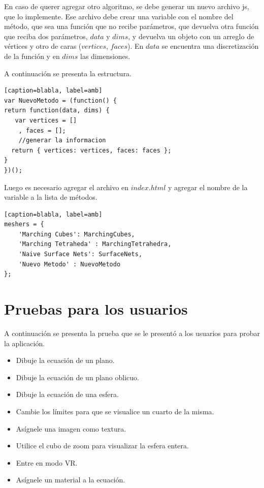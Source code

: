 \documentclass[12pt]{article}
\begin{document}
En caso de querer agregar otro algoritmo, se debe generar un nuevo archivo js, que lo implemente. Ese archivo debe crear una variable con el nombre del método, que sea una función que no recibe parámetros, que devuelva otra función que reciba dos parámetros, $data$ y $dims$, y devuelva un objeto con un arreglo de vértices y otro de caras ($vertices$, $faces$). En $data$ se encuentra una discretización de la función y en $dims$ las dimensiones.

A continuación se presenta la estructura.
\begin{lstlisting}[frame=single][caption=blabla, label=amb]
var NuevoMetodo = (function() {
return function(data, dims) {   
   var vertices = []
    , faces = [];
    //generar la informacion
  return { vertices: vertices, faces: faces };
}
})();
\end{lstlisting}

Luego es necesario agregar el archivo en $index.html$ y agregar el nombre de la variable a la lista de métodos.
\begin{lstlisting}[frame=single][caption=blabla, label=amb]
meshers = {
    'Marching Cubes': MarchingCubes,
    'Marching Tetraheda' : MarchingTetrahedra,
    'Naive Surface Nets': SurfaceNets,
    'Nuevo Metodo' : NuevoMetodo
};
\end{lstlisting}
\clearpage
\section{Pruebas para los usuarios}
A continuación se presenta la prueba que se le presentó a los usuarios para probar la aplicación.
\begin{itemize}
\item Dibuje la ecuación de un plano.
\item Dibuje la ecuación de un plano oblicuo.
\item Dibuje la ecuación de una esfera.
\item Cambie los límites para que se visualice un cuarto de la misma.
\item Asígnele una imagen como textura.
\item Utilice el cubo de zoom para visualizar la esfera entera.
\item Entre en modo VR.
\item Asígnele un material a la ecuación.
\end{itemize}
\clearpage
\end{document}
